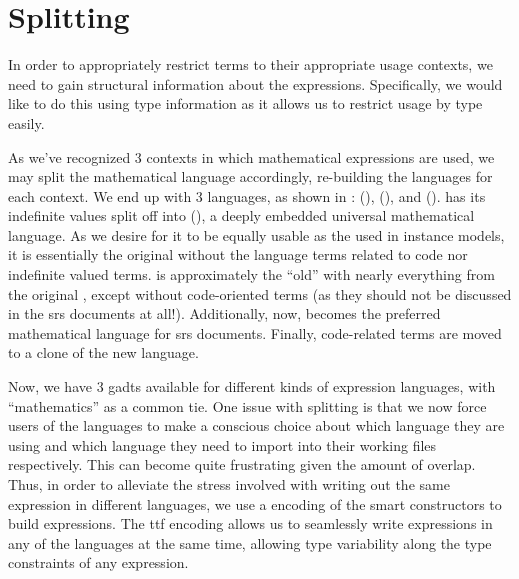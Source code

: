 \section{Splitting}
\label{chap:lang-division:sec:splitting}

In order to appropriately restrict terms to their appropriate usage contexts, we
need to gain structural information about the expressions. Specifically, we
would like to do this using type information as it allows us to restrict usage
by type easily.

\languageDivision{}

As we've recognized 3 contexts in which mathematical expressions are used, we
may split the mathematical language accordingly, re-building the languages for
each context. We end up with 3 languages, as shown in :
\Expr{} (), \ModelExpr{}
(), and \CodeExpr{} (). \Expr{} has its indefinite values split off into \ModelExpr{}
(), a deeply embedded universal mathematical
language. As we desire for it to be equally usable as the \Expr{} used in
instance models, it is essentially the original \Expr{} without the language
terms related to code nor indefinite valued terms. \ModelExpr{} is approximately
the ``old'' \Expr{} with nearly everything from the original \Expr{}, except
without code-oriented terms (as they should not be discussed in the \acs{srs}
documents at all!). Additionally, now, \ModelExpr{} becomes the preferred
mathematical language for \acs{srs} documents. Finally, code-related terms are
moved to a clone of the new \Expr{} language.

Now, we have 3 \acsp{gadt} available for different kinds of expression
languages, with ``mathematics'' as a common tie. One issue with splitting is
that we now force users of the languages to make a conscious choice about which
language they are using and which language they need to import into their
working files respectively. This can become quite frustrating given the amount
of overlap. Thus, in order to alleviate the stress involved with writing out the
same expression in different languages, we use a  encoding of the smart
constructors to build expressions. The \acs{ttf} encoding allows us to
seamlessly write expressions in any of the languages at the same time, allowing
type variability along the type constraints of any expression.

